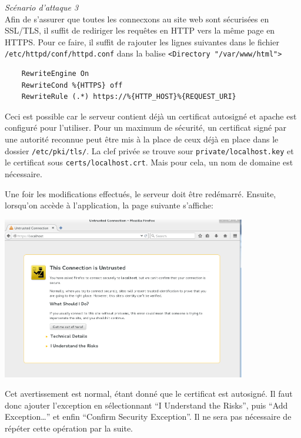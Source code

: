 \documentclass{article}
\begin{document}
\textit{Scénario d'attaque 3}\\

Afin de s'assurer que toutes les connecxons au site web sont sécurisées
en SSL/TLS, il suffit de rediriger les requêtes en HTTP vers la même page
en HTTPS. Pour ce faire, il suffit de rajouter les lignes suivantes dans
le fichier \texttt{/etc/httpd/conf/httpd.conf} dans la balise
\texttt{\textless{}Directory\ "/var/www/html"\textgreater{}}

\begin{verbatim}
    RewriteEngine On
    RewriteCond %{HTTPS} off
    RewriteRule (.*) https://%{HTTP_HOST}%{REQUEST_URI}
\end{verbatim}

Ceci est possible car le serveur contient déjà un certificat autosigné
et apache est configuré pour l'utiliser. Pour un maximum de sécurité, un
certificat signé par une autorité reconnue peut être mis à la place de
ceux déjà en place dans le dossier \texttt{/etc/pki/tls/}. La clef
privée se trouve sour \texttt{private/localhost.key} et le certificat
sous \texttt{certs/localhost.crt}. Mais pour cela, un nom de domaine est
nécessaire.

Une foir les modifications effectués, le serveur doit être redémarré.
Ensuite, lorsqu'on accède à l'application, la page suivante s'affiche:

\begin{center}\includegraphics[width=0.8\textwidth]{images/ssl.PNG}\end{center}

Cet avertissement est normal, étant donné que le certificat est
autosigné. Il faut donc ajouter l'exception en sélectionnant ``I
Understand the Risks'', puis ``Add Exception\ldots{}'' et enfin
``Confirm Security Exception''. Il ne sera pas nécessaire de répéter
cette opération par la suite.
\end{document}
